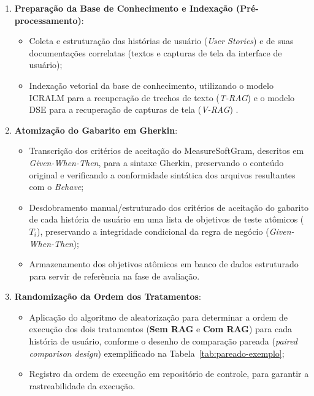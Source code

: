 \begin{enumerate}
    \item \textbf{Preparação da Base de Conhecimento e Indexação (Pré-processamento)}:
    \begin{itemize}
        \item Coleta e estruturação das histórias de usuário (\textit{User Stories}) e de suas documentações correlatas (textos e capturas de tela da interface de usuário);
        \item Indexação vetorial da base de conhecimento, utilizando o modelo ICRALM para a recuperação de trechos de texto (\textit{T-RAG}) e o modelo DSE para a recuperação de capturas de tela (\textit{V-RAG}) \cite{wang2025}.
    \end{itemize}

    \item \textbf{Atomização do Gabarito em Gherkin}:
    \begin{itemize}
        \item Transcrição dos critérios de aceitação do MeasureSoftGram, descritos em \textit{Given-When-Then}, para a sintaxe Gherkin, preservando o conteúdo original e verificando a conformidade sintática dos arquivos resultantes com o \textit{Behave};
        \item Desdobramento manual/estruturado dos critérios de aceitação do gabarito de cada história de usuário em uma lista de objetivos de teste atômicos ($T_i$), preservando a integridade condicional da regra de negócio (\textit{Given-When-Then});
        \item Armazenamento dos objetivos atômicos em banco de dados estruturado para servir de referência na fase de avaliação.
    \end{itemize}

    \item \textbf{Randomização da Ordem dos Tratamentos}:
    \begin{itemize}
        \item Aplicação do algoritmo de aleatorização para determinar a ordem de execução dos dois tratamentos (\textbf{Sem RAG} e \textbf{Com RAG}) para cada história de usuário, conforme o desenho de comparação pareada (\textit{paired comparison design}) exemplificado na Tabela~\ref{tab:pareado-exemplo};
        \item Registro da ordem de execução em repositório de controle, para garantir a rastreabilidade da execução.
    \end{itemize}


\end{enumerate}
